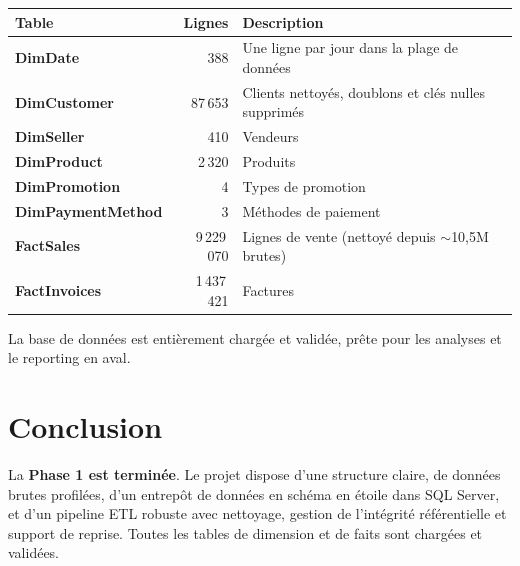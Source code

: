 \documentclass[11pt,a4paper]{article}
\newcommand{\tableheadcolor}{\rowcolor{primary}}
\newcommand{\tableheadfont}{\color{white}\bfseries}
\begin{document}
\begin{center}
\small
\begin{tabularx}{\textwidth}{>{\bfseries}l r X}
\toprule
\tableheadcolor
\tableheadfont Table & \tableheadfont Lignes & \tableheadfont Description \\
\midrule
DimDate & 388 & Une ligne par jour dans la plage de données \\
\rowcolor{lightbg}
DimCustomer & 87\,653 & Clients nettoyés, doublons et clés nulles supprimés \\
DimSeller & 410 & Vendeurs \\
\rowcolor{lightbg}
DimProduct & 2\,320 & Produits \\
DimPromotion & 4 & Types de promotion \\
\rowcolor{lightbg}
DimPaymentMethod & 3 & Méthodes de paiement \\
FactSales & 9\,229\,070 & Lignes de vente (nettoyé depuis $\sim$10,5M brutes) \\
\rowcolor{lightbg}
FactInvoices & 1\,437\,421 & Factures \\
\bottomrule
\end{tabularx}
\end{center}

La base de données est entièrement chargée et validée, prête pour les analyses et le reporting en aval.

\section{Conclusion}

\begin{sectionbox}
La \textbf{Phase 1 est terminée}. Le projet dispose d'une structure claire, de données brutes profilées, d'un entrepôt de données en schéma en étoile dans SQL Server, et d'un pipeline ETL robuste avec nettoyage, gestion de l'intégrité référentielle et support de reprise. Toutes les tables de dimension et de faits sont chargées et validées.
\end{sectionbox}
\end{document}

